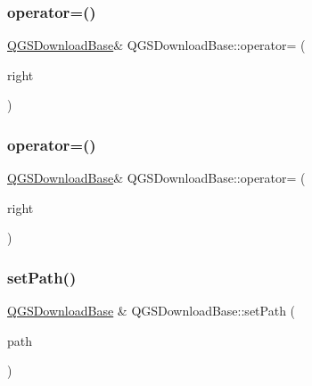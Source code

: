 \subsubsection{\texorpdfstring{operator=()}{operator=()}\hspace{0.1cm}{\footnotesize\ttfamily [1/2]}}
{\footnotesize\ttfamily \mbox{\hyperlink{class_q_g_s_download_base}{Q\+G\+S\+Download\+Base}}\& Q\+G\+S\+Download\+Base\+::operator= (\begin{DoxyParamCaption}\item[{const \mbox{\hyperlink{class_q_g_s_download_base}{Q\+G\+S\+Download\+Base}} \&}]{right }\end{DoxyParamCaption})\hspace{0.3cm}{\ttfamily [default]}}

\mbox{\label{class_q_g_s_download_base_a4525cdb0613715fa6163b68fa041c3af}} 
\subsubsection{\texorpdfstring{operator=()}{operator=()}\hspace{0.1cm}{\footnotesize\ttfamily [2/2]}}
{\footnotesize\ttfamily \mbox{\hyperlink{class_q_g_s_download_base}{Q\+G\+S\+Download\+Base}}\& Q\+G\+S\+Download\+Base\+::operator= (\begin{DoxyParamCaption}\item[{\mbox{\hyperlink{class_q_g_s_download_base}{Q\+G\+S\+Download\+Base}} \&\&}]{right }\end{DoxyParamCaption})\hspace{0.3cm}{\ttfamily [default]}}

\mbox{\label{class_q_g_s_download_base_a8aaa585b65964be5e18c36c9e56a6726}} 
\subsubsection{\texorpdfstring{set\+Path()}{setPath()}}
{\footnotesize\ttfamily \mbox{\hyperlink{class_q_g_s_download_base}{Q\+G\+S\+Download\+Base}} \& Q\+G\+S\+Download\+Base\+::set\+Path (\begin{DoxyParamCaption}\item[{const Q\+String \&}]{path }\end{DoxyParamCaption})}

